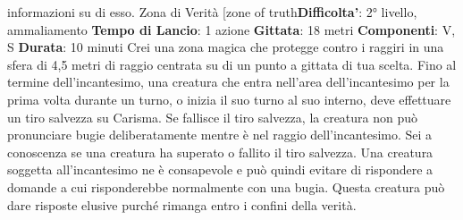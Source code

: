 \begin{multicols}{2}
informazioni su di esso.
Zona di Verità
[zone of truth\textbf{Difficolta'}:
2° livello, ammaliamento
\textbf{Tempo di Lancio}: 1 azione
\textbf{Gittata}: 18 metri
\textbf{Componenti}: V, S
\textbf{Durata}: 10 minuti
Crei una zona magica che protegge contro i raggiri in
una sfera di 4,5 metri di raggio centrata su di un punto a
gittata di tua scelta. Fino al termine dell’incantesimo,
una creatura che entra nell’area dell’incantesimo per la
prima volta durante un turno, o inizia il suo turno al suo
interno, deve effettuare un tiro salvezza su Carisma. Se
fallisce il tiro salvezza, la creatura non può pronunciare
bugie deliberatamente mentre è nel raggio
dell’incantesimo. Sei a conoscenza se una creatura ha
superato o fallito il tiro salvezza.
Una creatura soggetta all’incantesimo ne è
consapevole e può quindi evitare di rispondere a
domande a cui risponderebbe normalmente con una
bugia. Questa creatura può dare risposte elusive
purché rimanga entro i confini della verità.

\end{multicols}